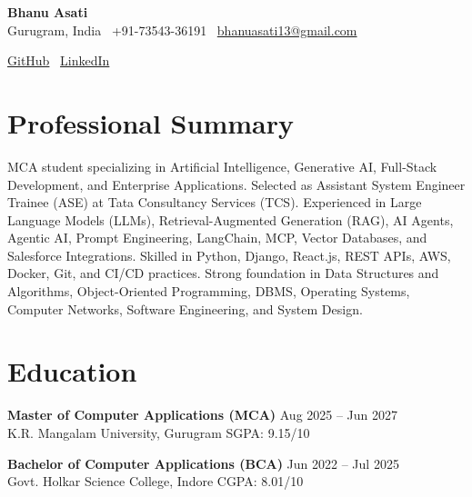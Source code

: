 \documentclass[10pt,a4paper]{article}
\begin{document}

\begin{center}
{\LARGE\textbf{Bhanu Asati}} \\[3pt]

Gurugram, India \textbar\ +91-73543-36191 \textbar\
\href{mailto:bhanuasati13@gmail.com}{bhanuasati13@gmail.com}

\href{https://github.com/BHANUASATI}{GitHub}
\textbar\
\href{https://linkedin.com/in/bhanu-asati-155493253/}{LinkedIn}
\end{center}

\section{Professional Summary}

MCA student specializing in Artificial Intelligence, Generative AI, Full-Stack Development, and Enterprise Applications. Selected as Assistant System Engineer Trainee (ASE) at Tata Consultancy Services (TCS). Experienced in Large Language Models (LLMs), Retrieval-Augmented Generation (RAG), AI Agents, Agentic AI, Prompt Engineering, LangChain, MCP, Vector Databases, and Salesforce Integrations. Skilled in Python, Django, React.js, REST APIs, AWS, Docker, Git, and CI/CD practices. Strong foundation in Data Structures and Algorithms, Object-Oriented Programming, DBMS, Operating Systems, Computer Networks, Software Engineering, and System Design.

\section{Education}

\textbf{Master of Computer Applications (MCA)} \hfill Aug 2025 -- Jun 2027\\
K.R. Mangalam University, Gurugram \hfill SGPA: 9.15/10

\textbf{Bachelor of Computer Applications (BCA)} \hfill Jun 2022 -- Jul 2025\\
Govt. Holkar Science College, Indore \hfill CGPA: 8.01/10
\end{document}
